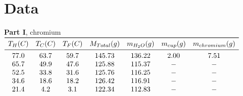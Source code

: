 \documentclass[12pt]{report}
\begin{document}
\section{Data}

\begin{center}

\begin{table}[h]
\textbf{Part I}, chromium \\
 $\begin{array}{ *{7}{c} }
\toprule
T_H(C) & T_C(C) & T_F(C) & M_{Total}(g) &  m_{H_2O}(g) & m_{cup}(g) & m_{chromium}(g) \\
\midrule
77.0 & 63.7 & 59.7 & 145.73 & 136.22 & 2.00 & 7.51 \\ 
65.7 & 49.9 & 47.6 & 125.88 & 115.37 & - & -\\ 
52.5 & 33.8 & 31.6 & 125.76 & 116.25 & - & - \\ 
34.6 & 18.6 & 18.2 & 126.42 & 116.91 & - & - \\ 
21.4 & 4.2 & 3.1 & 122.34 & 112.83 & - & - \\ 
\end{array}$
\end{table}
\end{center}
\end{document}
